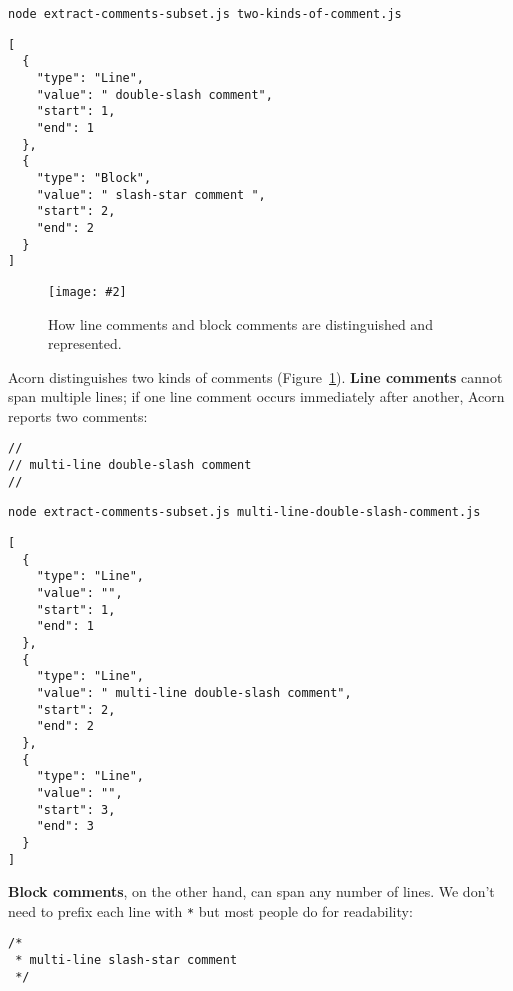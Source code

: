 \documentclass[krantzl]{krantz}
\newcommand{\figpdf}[4]{\begin{figure}%
\centering%
\texttt{[image: \#2]}%
\caption{#3}%
\label{#1}%
\end{figure}}
\newcommand{\figref}[1]{Figure~\ref{#1}}
\newcommand{\glossref}[1]{\textbf{#1}}
\begin{document}
\begin{lstlisting}[frame=single,frameround=tttt]
node extract-comments-subset.js two-kinds-of-comment.js
\end{lstlisting}



\begin{lstlisting}[frame=single,frameround=tttt]
[
  {
    "type": "Line",
    "value": " double-slash comment",
    "start": 1,
    "end": 1
  },
  {
    "type": "Block",
    "value": " slash-star comment ",
    "start": 2,
    "end": 2
  }
]
\end{lstlisting}


\figpdf{doc-generator-comments}{./doc-generator/comments.pdf}{How line comments and block comments are distinguished and represented.}{0.6}


Acorn distinguishes two kinds of comments (\figref{doc-generator-comments}).
\glossref{Line comments} cannot span multiple lines;
if one line comment occurs immediately after another,
Acorn reports two comments:


\begin{lstlisting}[frame=single,frameround=tttt]
//
// multi-line double-slash comment
//
\end{lstlisting}



\begin{lstlisting}[frame=single,frameround=tttt]
node extract-comments-subset.js multi-line-double-slash-comment.js
\end{lstlisting}



\begin{lstlisting}[frame=single,frameround=tttt]
[
  {
    "type": "Line",
    "value": "",
    "start": 1,
    "end": 1
  },
  {
    "type": "Line",
    "value": " multi-line double-slash comment",
    "start": 2,
    "end": 2
  },
  {
    "type": "Line",
    "value": "",
    "start": 3,
    "end": 3
  }
]
\end{lstlisting}



\glossref{Block comments},
on the other hand,
can span any number of lines.
We don't need to prefix each line with \texttt{*} but most people do for readability:


\begin{lstlisting}[frame=single,frameround=tttt]
/*
 * multi-line slash-star comment
 */
\end{lstlisting}
\end{document}

